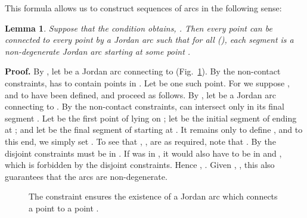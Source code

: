 \documentclass{article}
\newtheorem{lemma}[theorem]{Lemma}
\newcommand{\qedsymbol}{\ding{113}}
\newenvironment{proof}{\par\noindent\textbf{Proof.}}{\mbox{}\hfill\qedsymbol\par\bigskip}
\begin{document}
This formula allows us to construct sequences of arcs in the following
sense:
\begin{lemma}\label{lma:StackLemmai} 
Suppose that the condition  obtains,
. Then every point  can be connected to every
point  by a Jordan arc
 such that for all  \textup{(}\textup{)}, each segment  is a
non-degenerate Jordan arc starting at some point .
\end{lemma}
\begin{proof}
	By , let  be a Jordan arc connecting  to
         (Fig.~\ref{fig:stacki}). By the non-contact constraints,
         has to contain points in . Let  be
        one such point.  For  we suppose ,  and  to have been
        defined, and proceed as follows. By , let
         be a Jordan arc
        connecting  to . By the non-contact constraints,
         can intersect
         only in its final
        segment . Let  be the first point of
         lying on ; let  be
        the initial segment of  ending at ;
        and let  be the final segment of 
        starting at . It remains only to define
        , and to this end, we simply set
        . To see that , ,
        are as required, note that . By the disjoint constraints 
        must be in . If  was in , it would also
        have to be in  and , which
        is forbidden by the disjoint constraints. Hence , . Given , , this also guarantees that the arcs  are
        non-degenerate.
\end{proof}
\begin{figure}[h]\begin{center}
\end{center}
\caption{The constraint  ensures the existence of a Jordan arc 
 which connects a point  to a point .}
\label{fig:stacki}
\end{figure}
\end{document}
